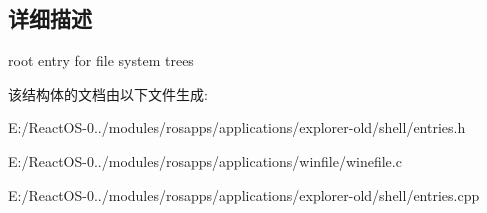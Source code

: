 \subsection{详细描述}
root entry for file system trees 

该结构体的文档由以下文件生成\+:\begin{DoxyCompactItemize}
\item 
E\+:/\+React\+O\+S-\/0../modules/rosapps/applications/explorer-\/old/shell/entries.\+h\item 
E\+:/\+React\+O\+S-\/0../modules/rosapps/applications/winfile/winefile.\+c\item 
E\+:/\+React\+O\+S-\/0../modules/rosapps/applications/explorer-\/old/shell/entries.\+cpp\end{DoxyCompactItemize}

